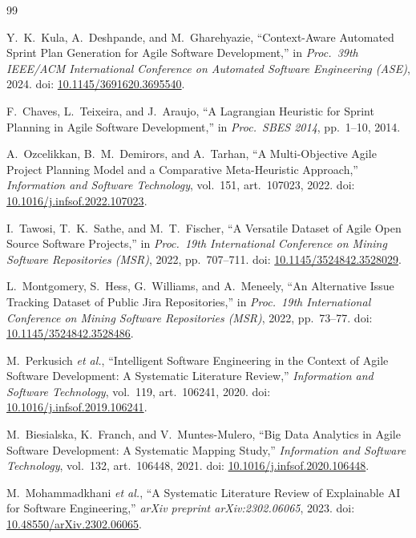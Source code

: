 \documentclass[conference]{IEEEtran}
\begin{document}
\begin{thebibliography}{99}

	Y.\ K.\ Kula, A.\ Deshpande, and M.\ Gharehyazie,
	``Context-Aware Automated Sprint Plan Generation for Agile Software Development,''
	in \emph{Proc.\ 39th IEEE/ACM International Conference on Automated Software
		Engineering (ASE)}, 2024.
	doi: \href{https://doi.org/10.1145/3691620.3695540}{10.1145/3691620.3695540}.

	F.\ Chaves, L.\ Teixeira, and J.\ Araujo,
	``A Lagrangian Heuristic for Sprint Planning in Agile Software Development,''
	in \emph{Proc.\ SBES 2014},
	pp.~1--10, 2014.

	A.\ Ozcelikkan, B.\ M.\ Demirors, and A.\ Tarhan,
	``A Multi-Objective Agile Project Planning Model and a Comparative Meta-Heuristic
	Approach,''
	\emph{Information and Software Technology},
	vol.~151, art.~107023, 2022.
	doi: \href{https://doi.org/10.1016/j.infsof.2022.107023}{10.1016/j.infsof.2022.107023}.

	I.\ Tawosi, T.\ K.\ Sathe, and M.\ T.\ Fischer,
	``A Versatile Dataset of Agile Open Source Software Projects,''
	in \emph{Proc.\ 19th International Conference on Mining Software Repositories
		(MSR)}, 2022, pp.~707--711.
	doi: \href{https://doi.org/10.1145/3524842.3528029}{10.1145/3524842.3528029}.

	L.\ Montgomery, S.\ Hess, G.\ Williams, and A.\ Meneely,
	``An Alternative Issue Tracking Dataset of Public Jira Repositories,''
	in \emph{Proc.\ 19th International Conference on Mining Software Repositories
		(MSR)}, 2022, pp.~73--77.
	doi: \href{https://doi.org/10.1145/3524842.3528486}{10.1145/3524842.3528486}.

	M.\ Perkusich \emph{et al.},
	``Intelligent Software Engineering in the Context of Agile Software Development:
	A Systematic Literature Review,''
	\emph{Information and Software Technology},
	vol.~119, art.~106241, 2020.
	doi: \href{https://doi.org/10.1016/j.infsof.2019.106241}{10.1016/j.infsof.2019.106241}.

	M.\ Biesialska, K.\ Franch, and V.\ Muntes-Mulero,
	``Big Data Analytics in Agile Software Development: A Systematic Mapping Study,''
	\emph{Information and Software Technology},
	vol.~132, art.~106448, 2021.
	doi: \href{https://doi.org/10.1016/j.infsof.2020.106448}{10.1016/j.infsof.2020.106448}.

	M.\ Mohammadkhani \emph{et al.},
	``A Systematic Literature Review of Explainable AI for Software Engineering,''
	\emph{arXiv preprint arXiv:2302.06065}, 2023.
	doi: \href{https://doi.org/10.48550/arXiv.2302.06065}{10.48550/arXiv.2302.06065}.


\end{thebibliography}
\end{document}
